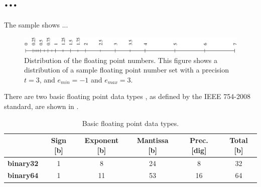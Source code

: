 \chapter{...}
\label{chap.2}
The sample  shows ...

\begin{figure}[htb]
\begin{center}
\includegraphics[width=.95\textwidth]{pic/float.pdf}
\end{center}
\caption{Distribution of the floating point numbers. This figure shows a distribution of a sample floating point number set with a precision $t=3$, and $e_{min}=-1$ and $e_{max}=3$.}
\label{fig.float}
\end{figure}


There are two basic floating point  data types , as defined by the IEEE 754-2008 \cite{ieee754} standard, are shown in .

\begin{table}[htb]
\begin{center}
\begin{tabular}{|r|c|c|c||c||c|}
\cline{2-6}

\multicolumn{1}{r|}{} & {\vrule height 13pt depth 6pt width 0pt\bf Sign} [b] & {\bf Exponent} [b] & {\bf Mantissa} [b] & {\bf Prec.} [dig] & {\bf Total} [b]\\ \cline{2-6}  \hline

\vrule height 10pt depth 20pt width 0pt
{\bf binary32}   			& 1    & 8        	& 24      & 8  	& 32\\ \hline

\vrule height 20pt depth 0pt width 1pt
{\bf binary64}   			& 1    & 11       	& 53      & 16	& 64\\ \hline
\end{tabular}
\end{center}
\caption{Basic floating point data types.}
\label{tab.floatingpointdatatypes}
\end{table}
